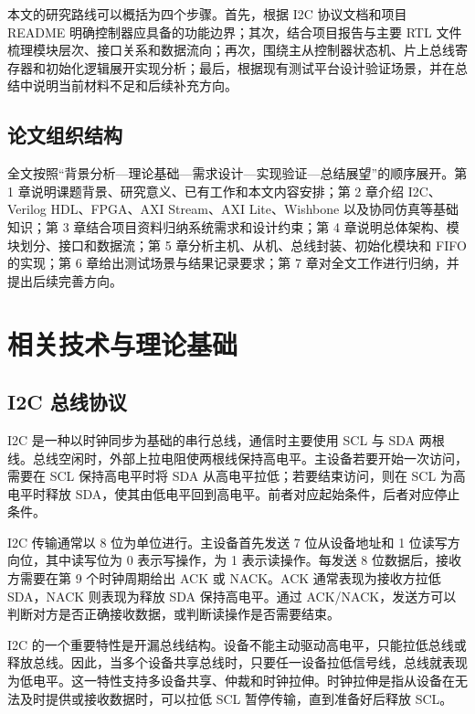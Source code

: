 \documentclass[12pt,a4paper]{article}
\numberwithin{equation}{section}
\begin{document}
本文的研究路线可以概括为四个步骤。首先，根据 I2C 协议文档和项目 README
明确控制器应具备的功能边界；其次，结合项目报告与主要 RTL
文件梳理模块层次、接口关系和数据流向；再次，围绕主从控制器状态机、片上总线寄存器和初始化逻辑展开实现分析；最后，根据现有测试平台设计验证场景，并在总结中说明当前材料不足和后续补充方向。

\subsection{论文组织结构}\label{ux8bbaux6587ux7ec4ux7ec7ux7ed3ux6784}

全文按照``背景分析---理论基础---需求设计---实现验证---总结展望''的顺序展开。第
1 章说明课题背景、研究意义、已有工作和本文内容安排；第 2 章介绍
I2C、Verilog HDL、FPGA、AXI Stream、AXI Lite、Wishbone
以及协同仿真等基础知识；第 3 章结合项目资料归纳系统需求和设计约束；第 4
章说明总体架构、模块划分、接口和数据流；第 5
章分析主机、从机、总线封装、初始化模块和 FIFO 的实现；第 6
章给出测试场景与结果记录要求；第 7
章对全文工作进行归纳，并提出后续完善方向。

\section{相关技术与理论基础}\label{ux76f8ux5173ux6280ux672fux4e0eux7406ux8bbaux57faux7840}

\subsection{I2C 总线协议}\label{i2c-ux603bux7ebfux534fux8bae}

I2C 是一种以时钟同步为基础的串行总线，通信时主要使用 SCL 与 SDA
两根线。总线空闲时，外部上拉电阻使两根线保持高电平。主设备若要开始一次访问，需要在
SCL 保持高电平时将 SDA 从高电平拉低；若要结束访问，则在 SCL
为高电平时释放
SDA，使其由低电平回到高电平。前者对应起始条件，后者对应停止条件。

I2C 传输通常以 8 位为单位进行。主设备首先发送 7 位从设备地址和 1
位读写方向位，其中读写位为 0 表示写操作，为 1 表示读操作。每发送 8
位数据后，接收方需要在第 9 个时钟周期给出 ACK 或 NACK。ACK
通常表现为接收方拉低 SDA，NACK 则表现为释放 SDA 保持高电平。通过
ACK/NACK，发送方可以判断对方是否正确接收数据，或判断读操作是否需要结束。

I2C
的一个重要特性是开漏总线结构。设备不能主动驱动高电平，只能拉低总线或释放总线。因此，当多个设备共享总线时，只要任一设备拉低信号线，总线就表现为低电平。这一特性支持多设备共享、仲裁和时钟拉伸。时钟拉伸是指从设备在无法及时提供或接收数据时，可以拉低
SCL 暂停传输，直到准备好后释放 SCL。
\end{document}
